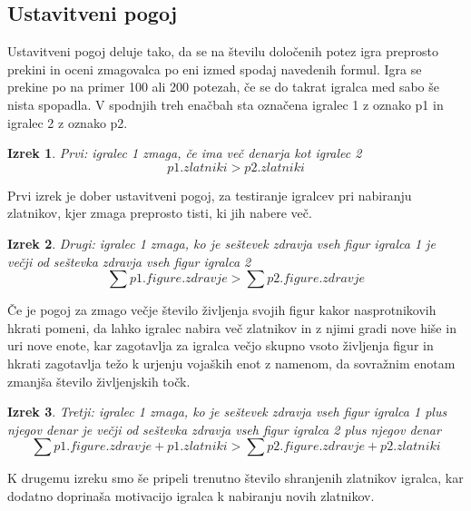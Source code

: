 \documentclass[a4paper, 12pt]{book}
\newtheorem{izrek}{Izrek}[chapter]
\begin{document}
\subsection{Ustavitveni pogoj}
Ustavitveni pogoj deluje tako, da se na številu določenih potez igra preprosto prekini in oceni zmagovalca po eni izmed spodaj navedenih formul.
Igra se prekine po na primer 100 ali 200 potezah, če se do takrat igralca med sabo še nista spopadla.
V spodnjih treh  enačbah sta označena igralec 1 z oznako p1 in igralec 2 z oznako p2.

\begin{izrek}
	\label{ustavitvenipogoj1}
Prvi: igralec 1 zmaga, če ima več denarja kot igralec 2
	\begin{equation}
p1.zlatniki > p2.zlatniki
	\label{eq:ustavitvenipogoj1}
	\end{equation}
\end{izrek}

Prvi izrek je dober ustavitveni pogoj, za testiranje igralcev pri nabiranju zlatnikov, kjer zmaga preprosto tisti, ki jih nabere več.

\begin{izrek}
	\label{ustavitvenipogoj2}
Drugi: igralec 1 zmaga, ko je seštevek zdravja vseh figur igralca 1 je večji od seštevka zdravja vseh figur igralca 2
	\begin{equation}
	\sum{p1.figure.zdravje} > \sum{p2.figure.zdravje}
	\label{eq:ustavitvenipogoj2}
	\end{equation}
\end{izrek}

Če je pogoj za zmago večje število življenja svojih figur kakor nasprotnikovih hkrati pomeni, da lahko igralec nabira več zlatnikov in z njimi gradi nove hiše in uri nove enote, kar zagotavlja za igralca večjo skupno vsoto življenja figur in hkrati zagotavlja težo k urjenju vojaških enot z namenom, da sovražnim enotam zmanjša število življenjskih točk.

\begin{izrek}
	\label{ustavitvenipogoj3}
Tretji: igralec 1 zmaga, ko je seštevek zdravja vseh figur igralca 1 plus njegov denar je večji od seštevka zdravja vseh figur igralca 2 plus njegov denar
	\begin{equation}
	\sum{p1.figure.zdravje} + p1.zlatniki > \sum{p2.figure.zdravje} + p2.zlatniki
	\label{eq:ustavitvenipogoj3}
	\end{equation}
\end{izrek}

K drugemu izreku smo še pripeli trenutno število shranjenih zlatnikov igralca, kar dodatno doprinaša motivacijo igralca k nabiranju novih zlatnikov.
\end{document}
